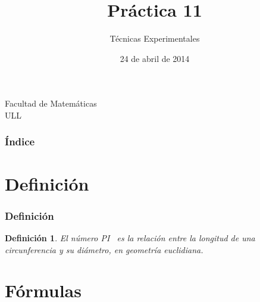 \documentclass{beamer}
\title[Numero Pi]{Práctica 11}
\author[Laura Hernández Bethencourt]{Técnicas Experimentales}
\date[23-04-2014]{24 de abril de 2014}
\newtheorem{definicion}{Definición}
\begin{document}
  
\begin{frame}
  \titlepage
  \begin{small}
    \begin{center}
     Facultad de Matemáticas \\
     ULL
    \end{center}
  \end{small}

\end{frame}

\begin{frame}
  \frametitle{Índice}  
  \tableofcontents[pausesections]
\end{frame}

\section{Definición}

\begin{frame}

\frametitle{Definición}

\begin{definicion}
El número \alert{PI}~\cite{wiki} es la relación entre la longitud de una circunferencia y su diámetro, en geometría euclidiana. 

\end{definicion}

\end{frame}

\section{Fórmulas}
\end{document}
